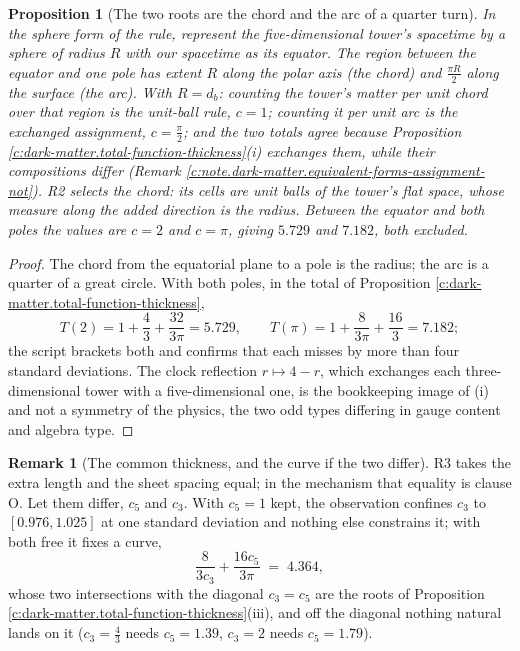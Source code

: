 \documentclass[11pt]{article}
\newtheorem{proposition}[theorem]{Proposition}
\theoremstyle{definition}
\newtheorem{remark}[theorem]{Remark}
\theoremstyle{plain}
\newcommand{\changedmark}[2]{\marginpar{\raggedright\scriptsize\color{#1}#2}}
\begin{document}
\begin{proposition}[The two roots are the chord and the arc of a quarter turn]\label{c:dark-matter.two-roots-are-chord-arc-quarter}
\changedmark{gray}{reworded}
In the sphere form of the rule, represent the five-dimensional tower's spacetime by a sphere of radius $R$ with our spacetime as its equator. The region between the equator and one pole has extent $R$ along the polar axis (the chord) and $\tfrac{\pi R}{2}$ along the surface (the arc). With $R = d_{b}$: counting the tower's matter per unit chord over that region is the unit-ball rule, $c = 1$; counting it per unit arc is the exchanged assignment, $c = \tfrac{\pi}{2}$; and the two totals agree because Proposition \ref{c:dark-matter.total-function-thickness}(i) exchanges them, while their compositions differ (Remark \ref{c:note.dark-matter.equivalent-forms-assignment-not}). R2 selects the chord: its cells are unit balls of the tower's flat space, whose measure along the added direction is the radius. Between the equator and both poles the values are $c = 2$ and $c = \pi$, giving $5.729$ and $7.182$, both excluded.
\end{proposition}
\begin{proof}
The chord from the equatorial plane to a pole is the radius; the arc is a quarter of a great circle. With both poles, in the total of Proposition \ref{c:dark-matter.total-function-thickness},
\[
T(2) = 1 + \frac{4}{3} + \frac{32}{3\pi} = 5.729, \qquad T(\pi) = 1 + \frac{8}{3\pi} + \frac{16}{3} = 7.182 ;
\]
the script brackets both and confirms that each misses by more than four standard deviations. The clock reflection $r \mapsto 4 - r$, which exchanges each three-dimensional tower with a five-dimensional one, is the bookkeeping image of (i) and not a symmetry of the physics, the two odd types differing in gauge content and algebra type.

\end{proof}

\begin{remark}[The common thickness, and the curve if the two differ]\label{c:note.dark-matter.common-thickness-curve-if-two-differ}
R3 takes the extra length and the sheet spacing equal; in the mechanism that equality is clause O. Let them differ, $c_{5}$ and $c_{3}$. With $c_{5} = 1$ kept, the observation confines $c_{3}$ to $[0.976, 1.025]$ at one standard deviation and nothing else constrains it; with both free it fixes a curve,
\[
\frac{8}{3c_{3}} + \frac{16c_{5}}{3\pi} \;=\; 4.364,
\]
whose two intersections with the diagonal $c_{3} = c_{5}$ are the roots of Proposition \ref{c:dark-matter.total-function-thickness}(iii), and off the diagonal nothing natural lands on it ($c_{3} = \tfrac{4}{3}$ needs $c_{5} = 1.39$, $c_{3} = 2$ needs $c_{5} = 1.79$).
\end{remark}
\end{document}
